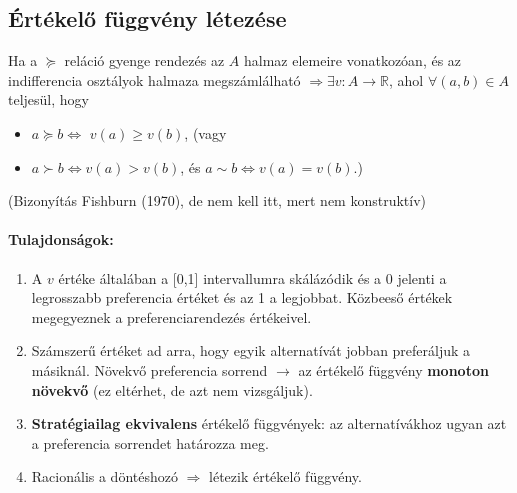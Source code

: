 \documentclass[a4paper,12pt]{article}
\begin{document}
\subsection{Értékelő függvény létezése}

Ha a $\succeq$ reláció gyenge rendezés az $A$ halmaz elemeire vonatkozóan, és az indifferencia osztályok halmaza megszámlálható
$\Rightarrow \exists v: A \rightarrow \mathbb{R} $, ahol $\forall(a,b) \in A$ teljesül, hogy
\begin{itemize}
\item $a \succeq b \Leftrightarrow$  $v(a) \geq v(b)$, (vagy
\item $a \succ b \Leftrightarrow v(a) > v(b)$, és $a \sim  b \Leftrightarrow v(a) = v(b).$)
\end{itemize}
(Bizonyítás Fishburn (1970), de nem kell itt, mert nem konstruktív)



\paragraph{Tulajdonságok:}

\begin{enumerate}

\item A $v$ értéke általában a [0,1] intervallumra skálázódik és a 0 jelenti a legrosszabb preferencia értéket és az 1 a legjobbat. Közbeeső értékek megegyeznek a preferenciarendezés értékeivel.

\item Számszerű értéket ad arra, hogy egyik alternatívát jobban preferáljuk a másiknál. Növekvő preferencia sorrend $\rightarrow$ az értékelő függvény \textbf{monoton növekvő} (ez eltérhet, de azt nem vizsgáljuk).

\item \textbf{Stratégiailag ekvivalens} értékelő függvények: az alternatívákhoz ugyan azt a preferencia sorrendet határozza meg.


\item Racionális a döntéshozó $\Rightarrow$ létezik értékelő függvény.

\end{enumerate}

\end{document}
